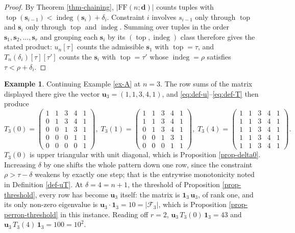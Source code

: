 \documentclass[11pt, a4paper, abstract=yes]{scrartcl}
\theoremstyle{definition}
\newtheorem{mexample}[definition]{Example}
\theoremstyle{remark}
\theoremstyle{plain}
\newcommand{\vek}[1]{\boldsymbol{#1}}
\newcommand{\indeg}{\operatorname{indeg}}
\newcommand{\tp}{\operatorname{top}}
\begin{document}
\begin{proof}
By Theorem \ref{thm-chaining}, \(|\mathrm{FF}(n;\vek d)|\) counts tuples with
\(\tp(\vek s_{i-1})<\indeg(\vek s_i)+\delta_i\). Constraint \(i\) involves \(s_{i-1}\) only through \(\tp\) and
\(\vek s_i\) only through \(\tp\) and \(\indeg\). Summing over tuples in the order \(\vek s_1,\vek s_2,\dots,\vek s_r\)
and grouping each \(\vek s_i\) by its \((\tp,\indeg)\) class therefore gives the stated product: \(u_n[\tau]\)
counts the admissible \(\vek s_1\) with \(\tp=\tau\), and \(T_n(\delta_i)[\tau][\tau']\) counts the \(\vek s_i\)
with \(\tp=\tau'\) whose \(\indeg=\rho\) satisfies \(\tau<\rho+\delta_i\).
\end{proof}

\begin{mexample}
Continuing Example \ref{ex-A} at \(n=3\). The row sums of the matrix displayed there give the vector
\(\vek u_3=(1,1,3,4,1)\), and \eqref{eq:def-u}--\eqref{eq:def-T} then produce
\[
  T_3(0)=\begin{pmatrix}
    1&1&3&4&1\\ 0&1&3&4&1\\ 0&0&1&3&1\\ 0&0&0&1&1\\ 0&0&0&0&1
  \end{pmatrix},
  \;
  T_3(1)=\begin{pmatrix}
    1&1&3&4&1\\ 1&1&3&4&1\\ 0&1&3&4&1\\ 0&0&1&3&1\\ 0&0&0&1&1
  \end{pmatrix},
  \;
  T_3(4)=\begin{pmatrix}
    1&1&3&4&1\\ 1&1&3&4&1\\ 1&1&3&4&1\\ 1&1&3&4&1\\ 1&1&3&4&1
  \end{pmatrix}.
\]
\(T_3(0)\) is upper triangular with unit diagonal, which is Proposition \ref{prop-delta0}. Increasing
\(\delta\) by one shifts the whole pattern down one row, since the constraint
\(\rho>\tau-\delta\) weakens by exactly one step; that is the entrywise monotonicity noted in
Definition \ref{def-uT}. At \(\delta=4=n+1\), the threshold of
Proposition \ref{prop-threshold}, every row has become \(\vek u_3\) itself: the matrix is
\(\vek 1_3\,\vek u_3\), of rank one, and its only non-zero eigenvalue is
\(\vek u_3\cdot\vek 1_3=10=\lvert\mathcal F_3\rvert\), which is Proposition \ref{prop-perron-threshold} in
this instance. Reading off \(r=2\), \(\vek u_3\,T_3(0)\,\vek 1_3=43\) and \(\vek u_3\,T_3(4)\,\vek 1_3=100=10^2\).
\label{ex-uT}
\end{mexample}
\end{document}
